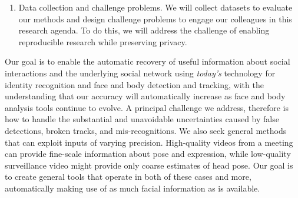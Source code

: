 \begin{enumerate}
\item Data collection and challenge problems. We will collect datasets to evaluate our methods and design challenge problems to engage our colleagues in this research agenda. To do this, we will address the challenge of enabling reproducible research while preserving privacy.

\end{enumerate}

Our goal is to enable the automatic recovery of useful information about social interactions and the underlying social network using \emph{today's} technology for identity recognition and face and body detection and tracking, with the understanding that our accuracy will automatically increase as face and body analysis tools continue to evolve. A principal challenge we address, therefore is how to handle the substantial and unavoidable uncertainties caused by false detections, broken tracks, and mis-recognitions. We also seek general methods that can exploit inputs of varying precision.  High-quality videos from a meeting can provide fine-scale information about pose and expression, while low-quality surveillance video might provide only coarse estimates of head pose. Our goal is to create general tools that operate in both of these cases and more, automatically making use of as much facial information as is available.

